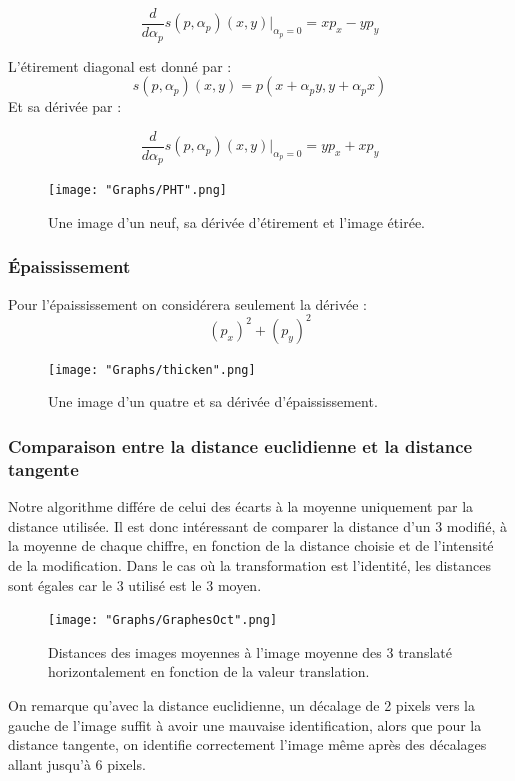 \documentclass[a4paper,11pt,twoside]{report}
\begin{document}
$$\frac{d}{d\alpha_p}s(p,\alpha_p)(x,y)|_{\alpha_p=0}=xp_x-yp_y$$ 

L'étirement diagonal est donné par : $$s(p,\alpha_p)(x,y) = p(x+\alpha_py,y+\alpha_px)$$  
Et sa dérivée par :

$$\frac{d}{d\alpha_p}s(p,\alpha_p)(x,y)|_{\alpha_p=0}=yp_x+xp_y$$ 

\begin{figure}[H]
  	\texttt{[image: "Graphs/PHT".png]}
  	\caption{Une image d'un neuf, sa dérivée d'étirement et l'image étirée.}
\end{figure}

\subsubsection{Épaississement}
Pour l'épaississement on considérera seulement la dérivée \cite[p.~127]{Elden} : $$(p_x)^2+(p_y)^2$$


\begin{figure}[H]
\begin{center}


  	\texttt{[image: "Graphs/thicken".png]}
  	\caption{Une image d'un quatre et sa dérivée d'épaississement.}
  	\end{center}
\end{figure}


\subsubsection{Comparaison entre la distance euclidienne et la distance tangente}
Notre algorithme différe de celui des écarts à la moyenne uniquement par la distance utilisée. Il est donc intéressant de comparer la distance d'un 3 modifié, à la moyenne de chaque chiffre, en fonction de la distance choisie et de l'intensité de la modification. Dans le cas où la transformation est l'identité, les distances sont égales car le 3 utilisé est le 3 moyen.

\begin{figure}[H]
  	\texttt{[image: "Graphs/GraphesOct".png]}
  	\caption{Distances des images moyennes à l'image moyenne des 3 translaté horizontalement en fonction de la valeur translation.}
\end{figure}

On remarque qu'avec la distance euclidienne, un décalage de 2 pixels vers la gauche de l'image suffit à avoir une mauvaise identification, alors que pour la distance tangente, on identifie correctement l'image même après des décalages allant jusqu'à 6 pixels.
\end{document}
